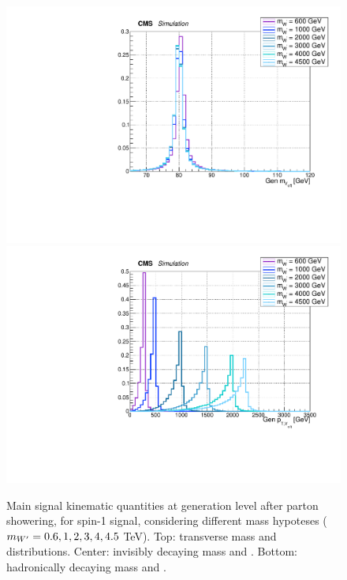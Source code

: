 \begin{figure}[!htb]
\begin{center}
     \includegraphics[width=.495\textwidth]{Gen_v9/XWZInv_g_VHadMass.pdf}%
     \includegraphics[width=.495\textwidth]{Gen_v9/XWZInv_g_VHadPt.pdf}%
   \end{center}
   \caption{Main signal kinematic quantities at generation level after parton showering, for spin-1 \Wp signal, considering different mass hypoteses ($m_{W'} = 0.6, 1, 2, 3, 4, 4.5$ TeV). Top: \Wp transverse mass and \pt distributions. Center: invisibly decaying \Z mass and \pt. Bottom: hadronically decaying \W mass and \pt.}
   \label{fig:genWprimeSignal1}
 \end{figure}

